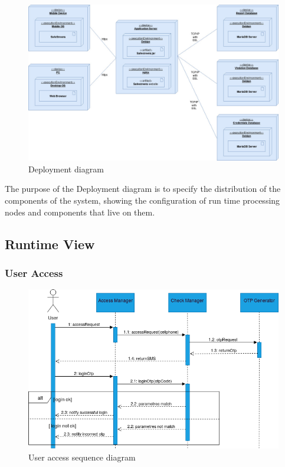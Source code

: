     \begin{figure}[H]

        \includegraphics[width=\textwidth]{Images/deployment.jpg}
        \caption{\label{fig:deployment}Deployment diagram}
        
    \end{figure}
	
    The purpose of the Deployment diagram is to specify the distribution 
    of the components of the system, showing the configuration of run 
    time processing nodes and components that live on them. 

\newpage

\subsection{Runtime View}
\subsubsection{User Access}
	\begin{figure}[H]
		\includegraphics[width=\textwidth]{Images/RunTimeViewUserAccess.png}		
		\caption{\label{fig:UserAccess}User access sequence diagram}
	\end{figure}
